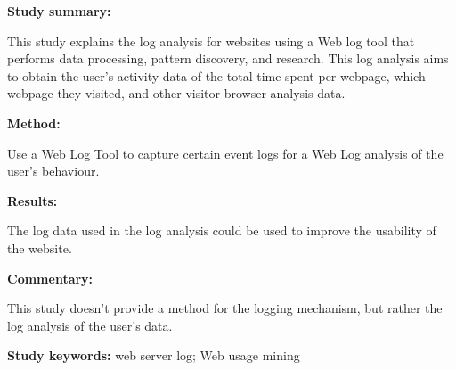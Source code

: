 \begin{tcolorbox}[colback=gray!5!white, colframe=pastelgreen!40!black, title=Analysis of visitor's behavior from Web Log using WebLog Expert Tool\cite{Kumar2017}]
	\begin{minipage}[t]{0.25\textwidth}
		\textbf{Study summary:}
	\end{minipage}
	\hfill
	\begin{minipage}[t]{0.65\textwidth}
		This study explains the log analysis for websites using a Web log tool that performs data processing, pattern discovery, and research. This log analysis aims to obtain the user's
activity data of the total time spent per webpage, which webpage they visited, and other visitor browser analysis data.
	\end{minipage}

	\vspace{0.75em} 

	\begin{minipage}[t]{0.25\textwidth}
		\textbf{Method:}
	\end{minipage}
	\hfill
	\begin{minipage}[t]{0.65\textwidth}
		Use a Web Log Tool to capture certain event logs for a Web Log analysis of the user's behaviour.
	\end{minipage}

	\vspace{0.75em} 

	\begin{minipage}[t]{0.25\textwidth}
		\textbf{Results:}
	\end{minipage}
	\hfill
	\begin{minipage}[t]{0.65\textwidth}
		The log data used in the log analysis could be used to improve the usability of the website.
	\end{minipage}

	\vspace{0.75em} 

	\begin{minipage}[t]{0.25\textwidth}
		\textbf{Commentary:}
	\end{minipage}
	\hfill
	\begin{minipage}[t]{0.65\textwidth}
		This study doesn't provide a method for the logging mechanism, but rather the log analysis of
the user's data.  
	\end{minipage}
	\tcblower
	\textbf{Study keywords:} web server log; Web usage mining
\end{tcolorbox}
